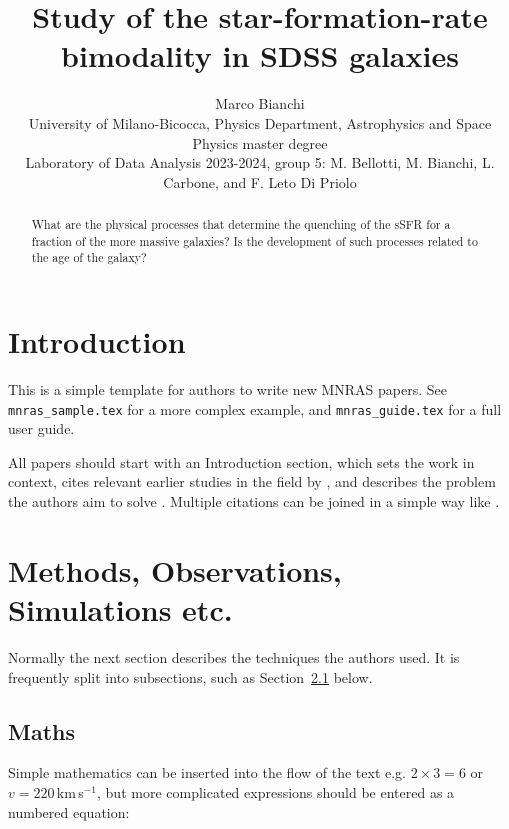 \documentclass[fleqn,usenatbib]{mnras}
\title[Short title, max. 45 characters]{Study of the star-formation-rate bimodality in SDSS galaxies}
\author[M. Bianchi]{
Marco Bianchi
\\
University of Milano-Bicocca, Physics Department, Astrophysics and Space Physics master degree\\
Laboratory of Data Analysis 2023-2024, group 5: M. Bellotti, M. Bianchi, L. Carbone, and F. Leto Di Priolo\\
}
\begin{document}
\label{firstpage}
\pagerange{\pageref{firstpage}--\pageref{lastpage}}
\maketitle

\begin{abstract}
What are the physical processes that determine the quenching of the sSFR for a fraction of the more massive galaxies? 
Is the development of such processes related to the age of the galaxy?
\end{abstract}






\section{Introduction}

This is a simple template for authors to write new MNRAS papers.
See \texttt{mnras\_sample.tex} for a more complex example, and \texttt{mnras\_guide.tex}
for a full user guide.

All papers should start with an Introduction section, which sets the work
in context, cites relevant earlier studies in the field by \citet{Fournier1901},
and describes the problem the authors aim to solve \citep[e.g.][]{vanDijk1902}.
Multiple citations can be joined in a simple way like \citet{deLaguarde1903, delaGuarde1904}.

\section{Methods, Observations, Simulations etc.}

Normally the next section describes the techniques the authors used.
It is frequently split into subsections, such as Section~\ref{sec:maths} below.

\subsection{Maths}
\label{sec:maths} %

Simple mathematics can be inserted into the flow of the text e.g. $2\times3=6$
or $v=220$\,km\,s$^{-1}$, but more complicated expressions should be entered
as a numbered equation:
\end{document}
